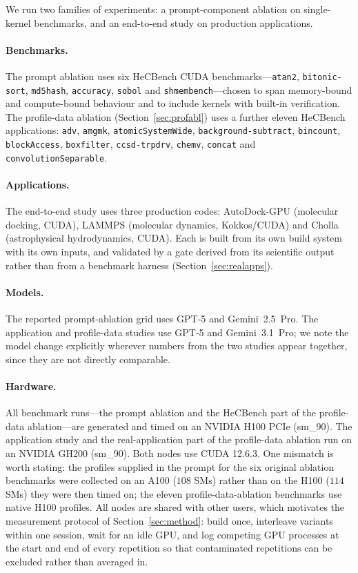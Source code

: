 We run two families of experiments: a prompt-component ablation on single-kernel benchmarks, and an
end-to-end study on production applications.

\paragraph{Benchmarks.}
The prompt ablation uses six HeCBench \cite{jin2023hecbench} CUDA benchmarks---\texttt{atan2},
\texttt{bitonic-sort}, \texttt{md5hash}, \texttt{accuracy}, \texttt{sobol} and
\texttt{shmembench}---chosen to span memory-bound and compute-bound behaviour and to include kernels
with built-in verification. The profile-data ablation (Section~\ref{sec:profabl}) uses a further eleven
HeCBench applications: \texttt{adv}, \texttt{amgmk}, \texttt{atomicSystemWide},
\texttt{background-subtract}, \texttt{bincount}, \texttt{blockAccess}, \texttt{boxfilter},
\texttt{ccsd-trpdrv}, \texttt{chemv}, \texttt{concat} and \texttt{convolutionSeparable}.

\paragraph{Applications.}
The end-to-end study uses three production codes: AutoDock-GPU (molecular docking, CUDA),
LAMMPS (molecular dynamics, Kokkos/CUDA) and Cholla (astrophysical hydrodynamics, CUDA). Each is built
from its own build system with its own inputs, and validated by a gate derived from its scientific
output rather than from a benchmark harness (Section~\ref{sec:realapps}).

\paragraph{Models.}
The reported prompt-ablation grid uses GPT-5 and Gemini~2.5~Pro. The application and profile-data
studies use GPT-5 and Gemini~3.1~Pro; we note the model change explicitly wherever numbers from the two
studies appear together, since they are not directly comparable.

\paragraph{Hardware.}
All benchmark runs---the prompt ablation and the HeCBench part of the profile-data ablation---are
generated and timed on an NVIDIA H100 PCIe (sm\_90). The application study and the real-application
part of the profile-data ablation run on an NVIDIA GH200 (sm\_90). Both nodes use CUDA 12.6.3. One
mismatch is worth stating: the profiles supplied in the prompt for the six original ablation benchmarks
were collected on an A100 ($108$ SMs) rather than on the H100 ($114$ SMs) they were then timed on; the
eleven profile-data-ablation benchmarks use native H100 profiles. All nodes are shared with other
users, which motivates the measurement protocol of Section~\ref{sec:method}: build once, interleave
variants within one session, wait for an idle GPU, and log competing GPU processes at the start and end
of every repetition so that contaminated repetitions can be excluded rather than averaged in.
